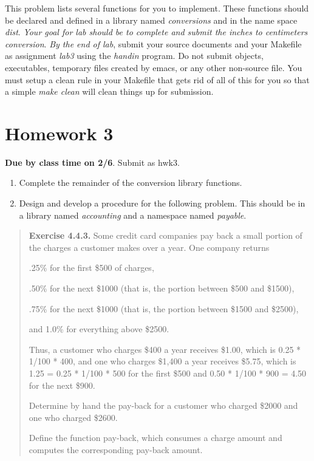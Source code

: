 \documentclass[nobib]{tufte-handout}
\begin{document}
This problem lists several functions for you to implement. These functions should be declared and defined in a library named \textit{conversions} and in the name space \textit{dist}. \textit{Your goal for lab should be to complete and submit the inches to centimeters conversion}.  \textit{By the end of lab}, submit your source documents and your Makefile as assignment \textit{lab3} using the  \textit{handin} program.  Do not submit objects, executables, temporary files created by emacs, or any other non-source file. You must setup a clean rule in your Makefile that gets rid of all of this for you so that a simple \textit{make clean} will clean things up for submission.

\newpage

\section{Homework 3}

\begin{center}
\textbf{Due by class time on 2/6}. Submit as hwk3.
\end{center}

\begin{enumerate}
\item Complete the remainder of the conversion library functions.
\item Design and develop a procedure for the following problem. This should be in a library named \textit{accounting} and a namespace named \textit{payable}.
\end{enumerate}

\begin{framed}
\begin{quote}
\textbf{Exercise 4.4.3.}   Some credit card companies pay back a small portion of the charges a customer makes over a year. One company returns

.25\% for the first \$500 of charges,

.50\% for the next \$1000 (that is, the portion between \$500 and \$1500),

.75\% for the next \$1000 (that is, the portion between \$1500 and \$2500),

and 1.0\% for everything above \$2500.

Thus, a customer who charges \$400 a year receives \$1.00, which is 0.25 * 1/100 * 400, and one who charges \$1,400 a year receives \$5.75, which is 1.25 = 0.25 * 1/100 * 500 for the first \$500 and 0.50 * 1/100 * 900 = 4.50 for the next \$900.

Determine by hand the pay-back for a customer who charged \$2000 and one who charged \$2600.

Define the function pay-back, which consumes a charge amount and computes the corresponding pay-back amount.
\end{quote}
\end{framed}
\end{document}
